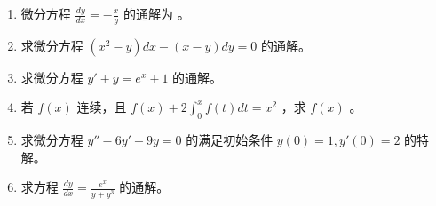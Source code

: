 \documentclass[12pt, a4paper]{article}
\begin{document}
\begin{enumerate}
    \item 微分方程 $ \frac{dy}{dx} = -\frac{x}{y} $ 的通解为 \underline{\hspace{2cm}}。

    \item 求微分方程 $ (x^{2}-y)dx-(x-y)dy=0 $ 的通解。

    \item 求微分方程 $ y' + y = e^{x} + 1 $ 的通解。

    \item 若 $ f(x) $ 连续，且 $ f(x) + 2 \int_{0}^{x} f(t) dt = x^{2} $ ，求 $ f(x) $ 。

    \item 求微分方程 $ y'' - 6y' + 9y = 0 $ 的满足初始条件 $ y(0) = 1, y'(0) = 2 $ 的特解。

    \item 求方程 $ \frac{dy}{dx}=\frac{e^{x}}{y+y^{3}} $ 的通解。
\end{enumerate}
\end{document}

